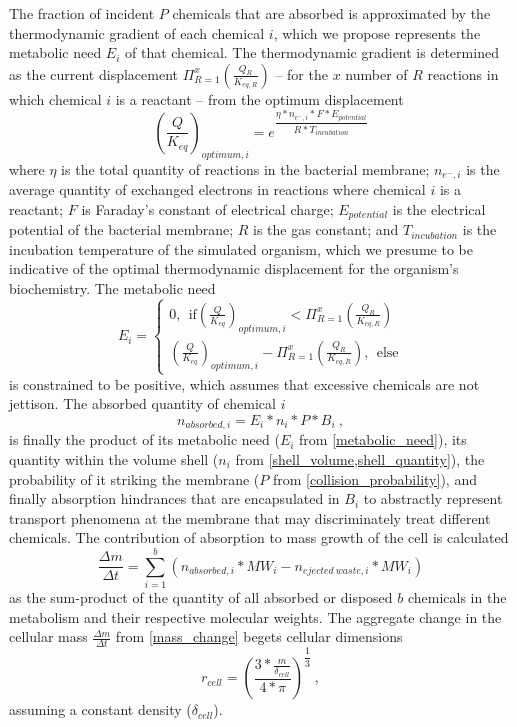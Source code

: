 \begin{supplementary}
The fraction of incident $P$ chemicals that are absorbed is approximated by the thermodynamic gradient of each chemical $i$, which we propose represents the metabolic need $E_i$ of that chemical. The thermodynamic gradient is determined as the current displacement $\Pi_{R=1}^x (\frac{Q_R}{K_{eq, R}})$ -- for the $x$ number of $R$ reactions in which chemical $i$ is a reactant  -- from the optimum displacement 
\begin{equation}
    \left(\frac{Q}{K_{eq}}\right)_{optimum,i}=e^{\dfrac{\eta*n_{e^-,i}* F * E_{potential}}{R*T_{incubation}}}
\end{equation}
where $\eta$ is the total quantity of reactions in the bacterial membrane; $n_{e^-,i}$ is the average quantity of exchanged electrons in reactions where chemical $i$ is a reactant; $F$ is Faraday’s constant of electrical charge; $E_{potential}$ is the electrical potential of the bacterial membrane; $R$ is the gas constant; and $T_{incubation}$ is the incubation temperature of the simulated organism, which we presume to be indicative of the optimal thermodynamic displacement for the organism's biochemistry. The metabolic need
\begin{equation} \label{metabolic_need}
    E_i= \begin{cases}
            0, ~~\text{if} \left(\frac{Q}{K_{eq}}\right)_{optimum,i}<\Pi_{R=1}^x \left(\frac{Q_R}{K_{eq, R}}\right) \\
            \left(\frac{Q}{K_{eq}}\right)_{optimum,i}-\Pi_{R=1}^x \left(\frac{Q_R}{K_{eq, R}}\right), ~~\text{else}
        \end{cases} 
\end{equation}
is constrained to be positive, which assumes that excessive chemicals are not jettison. The absorbed quantity of chemical $i$
\begin{equation}
    n_{absorbed,i}=E_i*n_i*P*B_i~,
\end{equation}
is finally the product of its metabolic need ($E_i$ from \cref{metabolic_need}), its quantity within the volume shell ($n_i$ from \cref{shell_volume,shell_quantity}), the probability of it striking the membrane ($P$ from \cref{collision_probability}), and finally absorption hindrances that are encapsulated in $B_i$ to abstractly represent transport phenomena at the membrane that may discriminately treat different chemicals. The contribution of absorption to mass growth of the cell is calculated
\begin{equation} \label{mass_change}
    \frac{\Delta m}{\Delta t}=\sum_{i=1}^b(n_{absorbed,i}*MW_i-n_{ejected~waste,i}*MW_i)
\end{equation}
as the sum-product of the quantity of all absorbed or disposed $b$ chemicals in the metabolism and their respective molecular weights. The aggregate change in the cellular mass $\frac{\Delta m}{\Delta t}$ from \cref{mass_change} begets cellular dimensions
\begin{equation}
    r_{cell}=\left(\frac{3*\frac{m}{\delta_{cell}}}{4*\pi}\right)^{\dfrac{1}{3}}~,
\end{equation}
assuming a constant density ($\delta_{cell}$). 



\end{supplementary}
